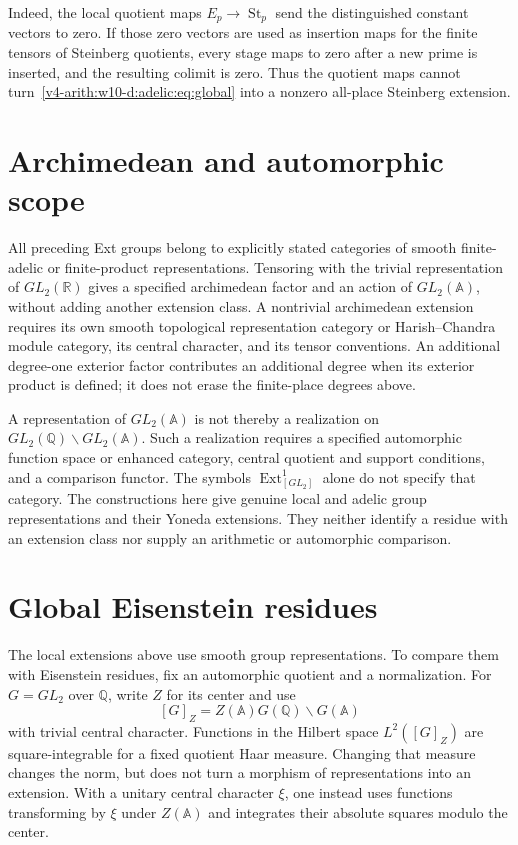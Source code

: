 Indeed, the local quotient maps $E_p\to\operatorname{St}_p$ send the distinguished
constant vectors to zero. If those zero vectors are used as insertion
maps for the finite tensors of Steinberg quotients, every stage maps to
zero after a new prime is inserted, and the resulting colimit is zero.
Thus the quotient maps cannot turn~\eqref{v4-arith:w10-d:adelic:eq:global} into a nonzero
all-place Steinberg extension.

\section{Archimedean and automorphic scope}

All preceding Ext groups belong to explicitly stated categories of
smooth finite-adelic or finite-product representations. Tensoring with
the trivial representation of $GL_2(\mathbb R)$ gives a specified
archimedean factor and an action of $GL_2(\mathbb A)$, without adding another
extension class. A nontrivial archimedean extension requires its own
smooth topological representation category or Harish--Chandra module
category, its central character, and its tensor conventions. An
additional degree-one exterior factor contributes an additional degree
when its exterior product is defined; it does not erase the finite-place
degrees above.

A representation of $GL_2(\mathbb A)$ is not thereby a realization on
$GL_2(\mathbb Q)\backslash GL_2(\mathbb A)$. Such a realization requires a specified
automorphic function space or enhanced category, central quotient and
support conditions, and a comparison functor. The symbols
$\operatorname{Ext}^1_{[GL_2]}$ alone do not specify that category. The constructions
here give genuine local and adelic group representations and their
Yoneda extensions. They neither identify a residue with an extension
class nor supply an arithmetic or automorphic comparison.


\section{Global Eisenstein residues}
\label{v4-arith:w10-d:X0}

The local extensions above use smooth group representations. To compare
them with Eisenstein residues, fix an automorphic quotient and a
normalization. For $G=GL_2$ over $\mathbb Q$, write $Z$ for its center
and use
\[
 [G]_Z=Z(\mathbb A)G(\mathbb Q)\backslash G(\mathbb A)
\]
with trivial central character. Functions in the Hilbert space
$L^2([G]_Z)$ are square-integrable for a fixed quotient Haar measure.
Changing that measure changes the norm, but does not turn a morphism
of representations into an extension. With a unitary central character
$\xi$, one instead uses functions transforming by $\xi$ under $Z(\mathbb A)$
and integrates their absolute squares modulo the center.

